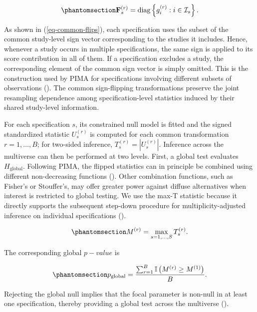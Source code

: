 \documentclass[
  man,
  longtable,
  nolmodern,
  notxfonts,
  notimes,
  colorlinks=true,linkcolor=blue,citecolor=blue,urlcolor=blue]{apa7}
\begin{document}
\begin{equation}\phantomsection\label{eq-common-flips}{
\mathbf{F}_s^{(r)}
=
\operatorname{diag}
\left\{
g_i^{(r)}:
i\in\mathcal{I}_s
\right\}.
}\end{equation}

As shown in (\ref{eq-common-flips}), each specification uses the subset
of the common study-level sign vector corresponding to the studies it
includes. Hence, whenever a study occurs in multiple specifications, the
same sign is applied to its score contribution in all of them. If a
specification excludes a study, the corresponding element of the common
sign vector is simply omitted. This is the construction used by PIMA for
specifications involving different subsets of observations
(). The common
sign-flipping transformations preserve the joint resampling dependence
among specification-level statistics induced by their shared study-level
information.

For each specification \(s\), its constrained null model is fitted and
the signed standardized statistic \(U_s^{(r)}\) is computed for each
common transformation \(r=1,\ldots,B\); for two-sided inference,
\(T_s^{(r)}=|U_s^{(r)}|\). Inference across the multiverse can then be
performed at two levels. First, a global test evaluates
\(H_{\mathrm{global}}\). Following PIMA, the flipped statistics can in
principle be combined using different non-decreasing functions
(). Other combination
functions, such as Fisher's or Stouffer's, may offer greater power
against diffuse alternatives when interest is restricted to global
testing. We use the max-T statistic because it directly supports the
subsequent step-down procedure for multiplicity-adjusted inference on
individual specifications ().

\begin{equation}\phantomsection\label{eq-max-stat}{
M^{(r)}
=
\max_{s=1,\ldots,S}
T_s^{(r)}.
}\end{equation}

The corresponding global \(p-value\) is

\begin{equation}\phantomsection\label{eq-global-p}{
p_{\mathrm{global}}
=
\frac{
\sum_{r=1}^{B}
\mathbb{I}
\left(
M^{(r)}
\geq
M^{(1)}
\right)
}{B}.
}\end{equation}

Rejecting the global null implies that the focal parameter is non-null
in at least one specification, thereby providing a global test across
the multiverse ().
\end{document}
